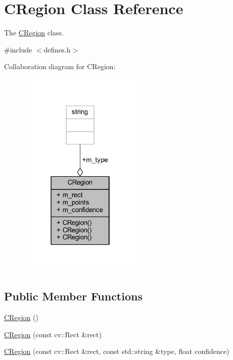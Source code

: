 \hypertarget{class_c_region}{}\section{C\+Region Class Reference}
\label{class_c_region}


The \mbox{\hyperlink{class_c_region}{C\+Region}} class.  




{\ttfamily \#include $<$defines.\+h$>$}



Collaboration diagram for C\+Region\+:\nopagebreak
\begin{figure}[H]
\begin{center}
\leavevmode
\includegraphics[width=166pt]{class_c_region__coll__graph}
\end{center}
\end{figure}
\subsection*{Public Member Functions}
\begin{DoxyCompactItemize}
\item 
\mbox{\hyperlink{class_c_region_a5f0eb7708629986b33543c3859ce782a}{C\+Region}} ()
\item 
\mbox{\hyperlink{class_c_region_a5d052268a9412b514430f60c32765618}{C\+Region}} (const cv\+::\+Rect \&rect)
\item 
\mbox{\hyperlink{class_c_region_aa946953a5829934b7c235adf7e8a8517}{C\+Region}} (const cv\+::\+Rect \&rect, const std\+::string \&type, float confidence)
\end{DoxyCompactItemize}
